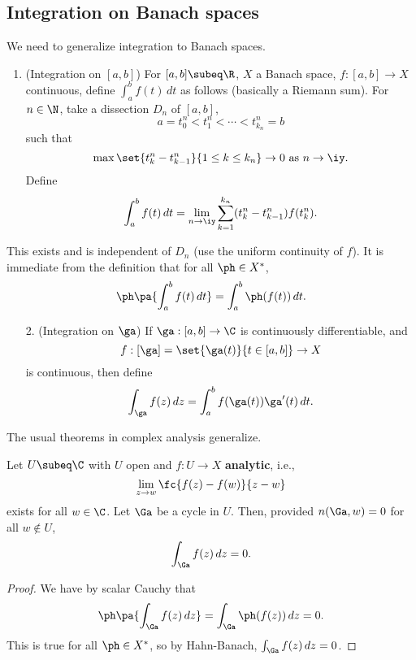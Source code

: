 \subsection{Integration on Banach spaces}
We need to generalize integration to Banach spaces.
\begin{df}
\begin{enumerate}
\item (Integration on $[a,b]$)
For $[a,b]\subeq \R$, $X$ a Banach space, $f:[a,b]\to X$ continuous, define $\int_a^b f(t)\,dt$ as follows (basically a Riemann sum). For $n\in \N$, take a dissection $D_n$ of $[a,b]$,
\[
a=t_0^n<t_1^n<\cdots <t_{k_n}^n=b
\]
such that
\[
\max\set{t_k^n-t_{k-1}^n}{1\le k\le k_n}\to 0\text{ as }n\to \iy.
\]
Define
\[
\int_a^b f(t)\,dt=\lim_{n\to \iy} \sum_{k=1}^{k_n} (t_k^n-t_{k-1}^n) f(t_k^n).
\]
\end{enumerate}
This exists and is independent of $D_n$ (use the uniform continuity of $f$). 
It is immediate from the definition that for all $\ph\in X^*$, 
\[\ph\pa{\int_a^b f(t)\,dt}=\int_a^b \ph(f(t))\,dt.\]
\begin{enumerate}
\item[2.] (Integration on $\ga$)
If $\ga:[a,b]\to \C$ is continuously differentiable, and
\[
f:[\ga]=\set{\ga(t)}{t\in [a,b]}\to X
\]
is continuous, then define
\[
\int_{\ga}f(z)\,dz=\int_a^b f(\ga(t))\ga'(t)\,dt.
\]
\end{enumerate}
\end{df}
The usual theorems in complex analysis generalize.
\begin{thm}
Let $U\subeq \C$ with $U$ open and $f:U\to X$ \textbf{analytic}, i.e.,
\[
\lim_{z\to w} \fc{f(z)-f(w)}{z-w}
\]
exists for all $w\in \C$. Let $\Ga$ be a cycle in $U$. Then, provided $n(\Ga,w)=0$ for all $w\nin U$,
\[
\int_{\Ga} f(z)\,dz=0.
\] 
\end{thm}
\begin{proof}
We have by scalar Cauchy that
\[
\ph\pa{\int_{\Ga}f(z)\,dz}=\int_{\Ga}\ph(f(z))\,dz=0.
\]
This is true for all $\ph\in X^*$, so by Hahn-Banach, $\int_{\Ga}f(z)\,dz=0$.
\end{proof}
